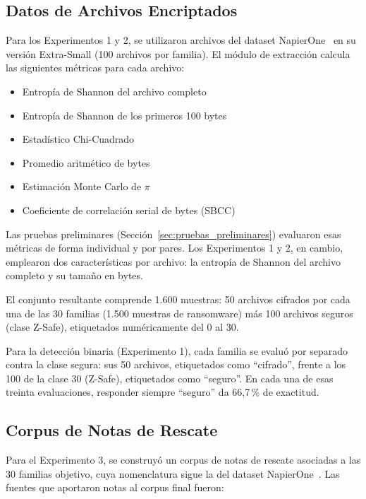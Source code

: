 \subsection{Datos de Archivos Encriptados}

Para los Experimentos 1 y 2, se utilizaron archivos del dataset NapierOne~\cite{paper_7_napierone} en su versión Extra-Small (100 archivos por familia). El módulo de extracción calcula las siguientes métricas para cada archivo:

\begin{itemize}
    \item Entropía de Shannon del archivo completo
    \item Entropía de Shannon de los primeros 100 bytes
    \item Estadístico Chi-Cuadrado
    \item Promedio aritmético de bytes
    \item Estimación Monte Carlo de $\pi$
    \item Coeficiente de correlación serial de bytes (SBCC)
\end{itemize}

Las pruebas preliminares (Sección~\ref{sec:pruebas_preliminares}) evaluaron esas métricas de forma individual y por pares. Los Experimentos 1 y 2, en cambio, emplearon dos características por archivo: la entropía de Shannon del archivo completo y su tamaño en bytes.

El conjunto resultante comprende 1.600 muestras: 50 archivos cifrados por cada una de las 30 familias (1.500 muestras de ransomware) más 100 archivos seguros (clase Z-Safe), etiquetados numéricamente del 0 al 30.

Para la detección binaria (Experimento 1), cada familia se evaluó por separado contra la clase segura: sus 50 archivos, etiquetados como ``cifrado'', frente a los 100 de la clase 30 (Z-Safe), etiquetados como ``seguro''. En cada una de esas treinta evaluaciones, responder siempre ``seguro'' da 66,7\,\% de exactitud.

\subsection{Corpus de Notas de Rescate}
\label{subsec:corpus_notas}

Para el Experimento 3, se construyó un corpus de notas de rescate asociadas a las 30 familias objetivo, cuya nomenclatura sigue la del dataset NapierOne~\cite{paper_7_napierone}. Las fuentes que aportaron notas al corpus final fueron:

